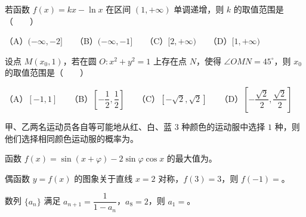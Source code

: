 \begin{question}
若函数 $f(x)=kx-\ln x$ 在区间 $(1,+\infty)$ 单调递增，则 $k$ 的取值范围是\mbox{（　　）}

（A）$(-\infty,-2]$　　（B）$(-\infty,-1]$　　（C）$[2,+\infty)$　　（D）$[1,+\infty)$

\end{question}
\begin{question}
设点 $M(x_0,1)$，若在圆 $O:x^2+y^2=1$ 上存在点 $N$，使得 $\angle OMN=45^\circ$，则 $x_0$ 的取值范围是\mbox{（　　）}

（A）$[-1,1]$　　（B）$\left[-\dfrac12,\dfrac12\right]$　　（C）$[-\sqrt2,\sqrt2]$　　（D）$\left[-\dfrac{\sqrt2}{2},\dfrac{\sqrt2}{2}\right]$

\end{question}

\begin{question}
甲、乙两名运动员各自等可能地从红、白、蓝 $3$ 种颜色的运动服中选择 $1$ 种，则他们选择相同颜色运动服的概率为\gkblank{}。

\end{question}
\begin{question}
函数 $f(x)=\sin(x+\varphi)-2\sin\varphi\cos x$ 的最大值为\gkblank{}。

\end{question}
\begin{question}
偶函数 $y=f(x)$ 的图象关于直线 $x=2$ 对称，$f(3)=3$，则 $f(-1)=$\gkblank{}。

\end{question}
\begin{question}
数列 $\{a_n\}$ 满足 $a_{n+1}=\dfrac1{1-a_n}$，$a_8=2$，则 $a_1=$\gkblank{}。

\end{question}

